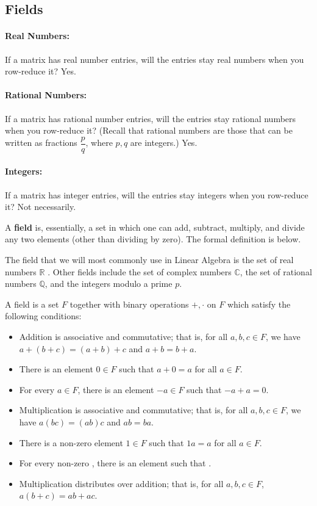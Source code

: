 \documentclass{package/notes}
\begin{document}
\subsection{Fields}
\paragraph{Real Numbers:}
If a matrix has real number entries, will the entries stay real numbers when you row-reduce it? Yes.

\paragraph{Rational Numbers:}
If a matrix has rational number entries, will the entries stay rational numbers when you row-reduce it? (Recall that rational numbers are those that can be written as fractions $\dfrac{p}{q}$, where $p,q$ are integers.) Yes.

\paragraph{Integers:}
If a matrix has integer entries, will the entries stay integers when you row-reduce it? Not necessarily.

A \textbf{field} is, essentially, a set in which one can add, subtract, multiply, and divide any two elements (other than dividing by zero). The formal definition is below.

The field that we will most commonly use in Linear Algebra is the set of real numbers $\mathbb{R}$ . Other fields include the set of complex numbers $\mathbb{C}$, the set of rational numbers $\mathbb{Q}$, and the integers modulo a prime $p$.

\begin{definition}

A field is a set $F$ together with binary operations $+,\cdot$ on $F$ which satisfy the following conditions:

\begin{itemize}
    \item Addition is associative and commutative; that is, for all $a,b,c\in F$, we have $a+(b+c)=(a+b)+c$ and $a+b=b+a$.
    \item There is an element $0\in F$ such that $a+0=a$ for all $a\in F$.
    \item For every $a\in F$, there is an element $-a\in F$ such that $-a+a=0$.
    \item Multiplication is associative and commutative; that is, for all $a,b,c \in F$, we have $a(bc)=(ab)c$ and $ab=ba$.
    \item There is a non-zero element $1\in F$ such that $1a=a$ for all $a\in F$.
    \item For every non-zero , there is an element  such that .
    \item Multiplication distributes over addition; that is, for all $a,b,c\in F$, $a(b+c)=ab+ac$.
\end{itemize}
\end{definition}
\end{document}
